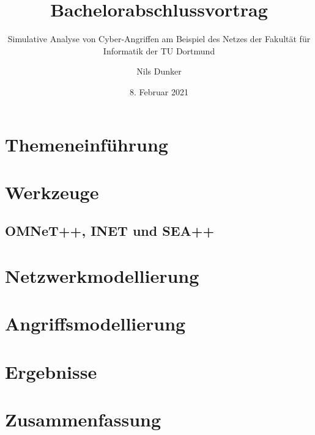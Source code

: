 \documentclass[aspectratio=169,usenames,dvipsnames,rgb]{../tuprolis}
\title{Bachelorabschlussvortrag}
\subtitle{Simulative Analyse von Cyber-Angriffen am Beispiel des Netzes der Fakultät für Informatik der TU Dortmund}
\institute{Bachelorabschlussvortrag am Lehrstuhl 4 - Informatik}
\author{Nils Dunker}
\date{8. Februar 2021}
\begin{document}
	
\frame[plain]{\titlepage} 



\section{Themeneinführung}



{
	\section{Werkzeuge}
}

\subsection{OMNeT++, INET und SEA++}
 



\section{Netzwerkmodellierung}


{
	\section{Angriffsmodellierung}
}



\section{Ergebnisse}



\section{Zusammenfassung}





\appendix

\end{document}
